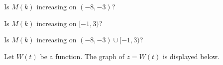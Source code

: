 \documentclass{ximera}
\begin{document}
\begin{exercise}  

Is $M(k)$ increasing on $(-8,-3)$?

\begin{multipleChoice}
\end{multipleChoice}

\end{exercise}






\begin{exercise}  

Is $M(k)$ increasing on $[-1,3)$?

\begin{multipleChoice}
\end{multipleChoice}

\end{exercise}





\begin{exercise}  

Is $M(k)$ increasing on $(-8,-3) \cup [-1,3)$?

\begin{multipleChoice}
\end{multipleChoice}

\end{exercise}












Let $W(t)$ be a function.  The graph of $z = W(t)$ is displayed below. 
\end{document}
